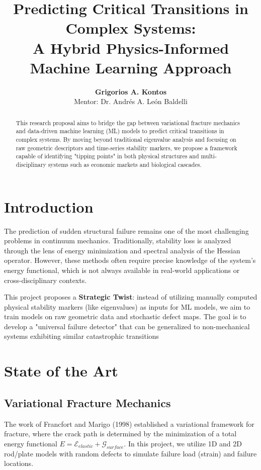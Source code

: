 \documentclass[12pt]{article}
\title{\textbf{Predicting Critical Transitions in Complex Systems: \\ A Hybrid Physics-Informed Machine Learning Approach}}
\author{\textbf{Grigorios A. Kontos} \\ 
Mentor: Dr. Andrés A. León Baldelli }
\date{}
\begin{document}
\maketitle

\begin{abstract}
This research proposal aims to bridge the gap between variational fracture mechanics and data-driven machine learning (ML) models to predict critical transitions in complex systems. By moving beyond traditional eigenvalue analysis and focusing on raw geometric descriptors and time-series stability markers, we propose a framework capable of identifying "tipping points" in both physical structures and multi-disciplinary systems such as economic markets and biological cascades.
\end{abstract}

\section{Introduction}
The prediction of sudden structural failure remains one of the most challenging problems in continuum mechanics. Traditionally, stability loss is analyzed through the lens of energy minimization and spectral analysis of the Hessian operator. However, these methods often require precise knowledge of the system's energy functional, which is not always available in real-world applications or cross-disciplinary contexts.

This project proposes a \textbf{Strategic Twist}: instead of utilizing manually computed physical stability markers (like eigenvalues) as inputs for ML models, we aim to train models on raw geometric data and stochastic defect maps. The goal is to develop a "universal failure detector" that can be generalized to non-mechanical systems exhibiting similar catastrophic transitions





\section{State of the Art}
\subsection{Variational Fracture Mechanics}
The work of Francfort and Marigo (1998) established a variational framework for fracture, where the crack path is determined by the minimization of a total energy functional $E = \mathcal{E}_{elastic} + \mathcal{G}_{surface}$. In this project, we utilize 1D and 2D rod/plate models with random defects to simulate failure load (strain) and failure locations.
\end{document}
